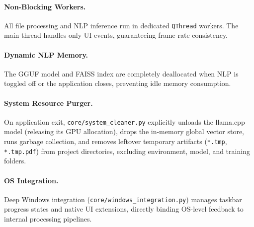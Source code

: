 \documentclass[11pt]{article}
\begin{document}
\paragraph{Non-Blocking Workers.}
All file processing and NLP inference run in dedicated \texttt{QThread}
workers. The main thread handles only UI events, guaranteeing frame-rate
consistency.

\paragraph{Dynamic NLP Memory.}
The GGUF model and FAISS index are completely deallocated when NLP is toggled
off or the application closes, preventing idle memory consumption.

\paragraph{System Resource Purger.}
On application exit, \texttt{core/system\_cleaner.py} explicitly unloads the llama.cpp model (releasing its GPU allocation), drops the in-memory global vector store, runs garbage collection, and removes leftover temporary artifacts (\texttt{*.tmp}, \texttt{*.tmp.pdf}) from project directories, excluding environment, model, and training folders.

\paragraph{OS Integration.}
Deep Windows integration (\texttt{core/windows\_integration.py}) manages taskbar progress states and native UI extensions, directly binding OS-level feedback to internal processing pipelines.
\end{document}
